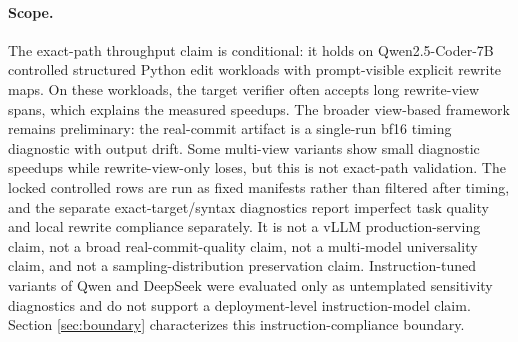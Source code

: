 \documentclass[11pt,a4paper]{article}
\begin{document}
\paragraph{Scope.}
The exact-path throughput claim is conditional: it holds on Qwen2.5-Coder-7B
controlled structured Python edit workloads with prompt-visible explicit
rewrite maps. On these workloads, the target verifier often accepts long
rewrite-view spans, which explains the measured speedups. The broader
view-based framework remains preliminary: the real-commit artifact is a
single-run bf16 timing diagnostic with output drift. Some multi-view variants
show small diagnostic speedups while rewrite-view-only loses, but this is not
exact-path validation. The locked controlled
rows are run as fixed manifests rather than filtered after timing, and the
separate exact-target/syntax diagnostics report imperfect task quality and
local rewrite compliance separately. It is not a vLLM production-serving claim,
not a broad real-commit-quality claim, not a multi-model universality claim,
and not a sampling-distribution preservation claim. Instruction-tuned variants
of Qwen and DeepSeek were evaluated only as untemplated sensitivity diagnostics
and do not support a deployment-level instruction-model claim.
Section \ref{sec:boundary} characterizes this instruction-compliance boundary.
\end{document}

